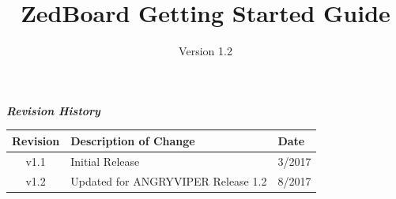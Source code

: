 \def\docTitle{ZedBoard Getting Started Guide}
\def\docVersion{1.2}

\date{Version \docVersion} %
\title{\docTitle}
\usepackage[T1]{fontenc} %
\usepackage{graphicx}
\graphicspath{ {figures/} }

\maketitle
\newpage

	\begin{center}
	\textit{\textbf{Revision History}}
		\begin{table}[H]
		\label{table:revisions} %
			\begin{tabularx}{\textwidth}{|c|X|l|}
			\hline
			\rowcolor{blue}
			\textbf{Revision} & \textbf{Description of Change} & \textbf{Date} \\
		    \hline
		    v1.1 & Initial Release & 3/2017 \\
            \hline
            v1.2 & Updated for ANGRYVIPER Release 1.2 & 8/2017 \\
            \hline
			\end{tabularx}
		\end{table}
	\end{center}

